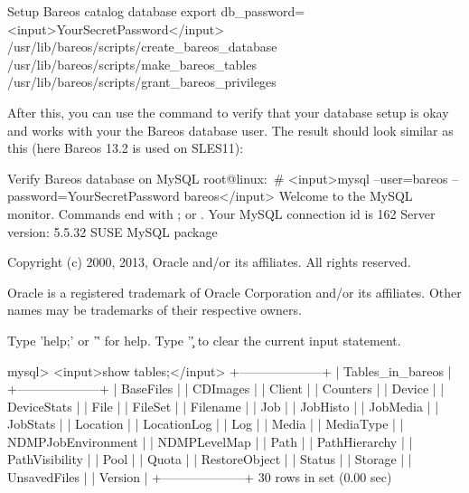\begin{commands}{Setup Bareos catalog database}
export db_password=<input>YourSecretPassword</input>
/usr/lib/bareos/scripts/create_bareos_database
/usr/lib/bareos/scripts/make_bareos_tables
/usr/lib/bareos/scripts/grant_bareos_privileges
\end{commands}

After this, you can use the  command to verify that your database setup is okay
and works with your the Bareos database user.
The result should look similar as this (here Bareos 13.2 is used on SLES11):

\begin{commands}{Verify Bareos database on MySQL}
root@linux:~# <input>mysql --user=bareos --password=YourSecretPassword bareos</input>
Welcome to the MySQL monitor.  Commands end with ; or \g.
Your MySQL connection id is 162
Server version: 5.5.32 SUSE MySQL package

Copyright (c) 2000, 2013, Oracle and/or its affiliates. All rights reserved.

Oracle is a registered trademark of Oracle Corporation and/or its
affiliates. Other names may be trademarks of their respective
owners.

Type 'help;' or '\h' for help. Type '\c' to clear the current input statement.

mysql> <input>show tables;</input>
+--------------------+
| Tables_in_bareos   |
+--------------------+
| BaseFiles          |
| CDImages           |
| Client             |
| Counters           |
| Device             |
| DeviceStats        |
| File               |
| FileSet            |
| Filename           |
| Job                |
| JobHisto           |
| JobMedia           |
| JobStats           |
| Location           |
| LocationLog        |
| Log                |
| Media              |
| MediaType          |
| NDMPJobEnvironment |
| NDMPLevelMap       |
| Path               |
| PathHierarchy      |
| PathVisibility     |
| Pool               |
| Quota              |
| RestoreObject      |
| Status             |
| Storage            |
| UnsavedFiles       |
| Version            |
+--------------------+
30 rows in set (0.00 sec)


\end{commands}
